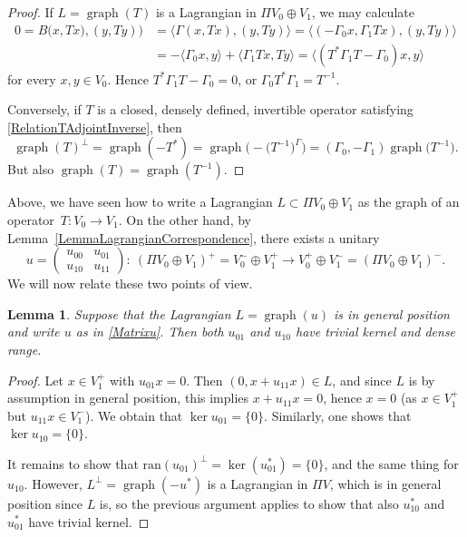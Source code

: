\documentclass[10pt,a4paper]{amsart}
\numberwithin{equation}{section}
\newtheorem{Lemma}[Theorem]{Lemma}
\DeclareMathOperator{\graph}{\mathrm{graph}}
\begin{document}
\begin{proof}
If $L = \graph(T)$ is a Lagrangian in $\Pi V_0 \oplus V_1$, we may calculate
\begin{align*}
 0 = B\bigl(x, Tx), (y, Ty)\bigr)
 &=\langle \Gamma(x, Tx), (y, Ty)\rangle = \langle (-\Gamma_0 x, \Gamma_1Tx), (y, Ty)\rangle \\
 &= - \langle \Gamma_0 x, y\rangle + \langle \Gamma_1 Tx, Ty \rangle = \langle (T^* \Gamma_1 T - \Gamma_0) x, y\rangle
\end{align*}
for every $x, y \in V_0$.
Hence $T^* \Gamma_1 T - \Gamma_0 = 0$, or $\Gamma_0 T^* \Gamma_1 = T^{-1}$.


Conversely, if $T$ is a closed, densely defined, invertible operator satisfying \eqref{RelationTAdjointInverse}, then
\begin{equation*}
\graph(T)^\perp = \graph(-T^*) = \graph\bigl(- \big(T^{-1}\big)^\Gamma\bigr) = (\Gamma_0, -\Gamma_1)\graph\bigl(T^{-1}\bigr).
\end{equation*}
But also $\graph(T) = \graph(T^{-1})$.
\end{proof}

Above, we have seen how to write a Lagrangian $L \subset \Pi V_0 \oplus V_1$ as the graph of an operator~${T\colon V_0 \to V_1}$.
On the other hand, by Lemma~\ref{LemmaLagrangianCorrespondence}, there exists a unitary
\begin{equation} \label{Matrixu}
 u = \begin{pmatrix} u_{00} & u_{01} \\ u_{10} & u_{11} \end{pmatrix}\colon\ (\Pi V_0 \oplus V_1)^+ = V_0^- \oplus V_1^+ \longrightarrow V_0^+ \oplus V_1^- = (\Pi V_0 \oplus V_1)^-.
\end{equation}
We will now relate these two points of view.

\begin{Lemma} \label{LemmaU01TrivialKernel}
Suppose that the Lagrangian $L = \graph(u)$ is in general position and write $u$ as in \eqref{Matrixu}.
Then both $u_{01}$ and $u_{10}$ have trivial kernel and dense range.
\end{Lemma}

\begin{proof}
Let $x \in V_1^+$ with $u_{01} x = 0$.
Then $(0, x+u_{11}x) \in L$, and since $L$ is by assumption in general position, this implies $x + u_{11}x = 0$, hence $x = 0$ \big(as $x \in V_1^+$ but $u_{11}x \in V_1^-$\big).
We obtain that $\ker u_{01} = \{0\}$.
Similarly, one shows that $\ker u_{10} = \{0\}$.

It remains to show that $\mathrm{ran}(u_{01})^{\perp} = \ker(u_{01}^*) = \{0\}$, and the same thing for $u_{10}$.
However, $L^{\perp} = \graph(-u^*)$ is a Lagrangian in $\Pi V$, which is in general position since $L$ is, so the previous argument applies to show that also $u_{10}^*$ and $u_{01}^*$ have trivial kernel.
\end{proof}
\end{document}
